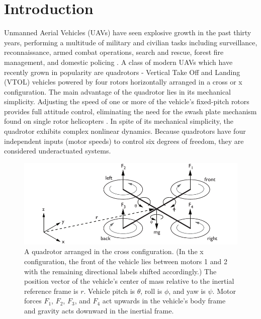 \chapter{Introduction}

Unmanned Aerial Vehicles (UAVs) have seen explosive growth in the past thirty years, performing a multitude of military and civilian tasks including surveillance, reconnaissance, armed combat operations, search and rescue, forest fire management, and domestic policing \cite{sarris2001survey, valavanis2007advances}. A class of modern UAVs which have recently grown in popularity are quadrotors -  Vertical Take Off and Landing (VTOL) vehicles powered by four rotors horizontally arranged in a cross or x configuration. The main advantage of the quadrotor lies in its mechanical simplicity. Adjusting the speed of one or more of the vehicle's fixed-pitch rotors provides full attitude control, eliminating the need for the swash plate mechanism found on single rotor helicopters \cite{bramwell2001bramwell, gupte2012survey}. In spite of its mechanical simplicity, the quadrotor exhibits complex nonlinear dynamics. Because quadrotors have four independent inputs (motor speeds) to control six degrees of freedom, they are considered underactuated systems.
\begin{figure}[htb!]
	\centering
	\includegraphics{../fig/quad.pdf}
	\caption[A quadrotor arranged in the cross configuration.]{A quadrotor arranged in the cross configuration. (In the x configuration, the front of the vehicle lies between motors 1 and 2 with the remaining directional labels shifted accordingly.) The position vector of the vehicle's center of mass relative to the inertial reference frame is $r$. Vehicle pitch is $\theta$, roll is $\phi$, and yaw is $\psi$. Motor forces $F_1$, $F_2$, $F_3$, and $F_4$ act upwards in the vehicle's body frame and gravity acts downward in the inertial frame.}
\end{figure}


